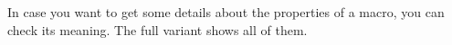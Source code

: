 \stopsectionlevel

\startsectionlevel[title=Introspection]

In case you want to get some details about the properties of a macro, you can
check its meaning. The full variant shows all of them.

\startbuffer

\permanent\tolerant\protected{}

\meaningless\MyFoo\par
\meaning    \MyFoo\par
\meaningfull\MyFoo\par
\stopbuffer

\typebuffer[option=TEX]

\startpacked \getbuffer \stoppacked

\stopsectionlevel


\stopdocument

